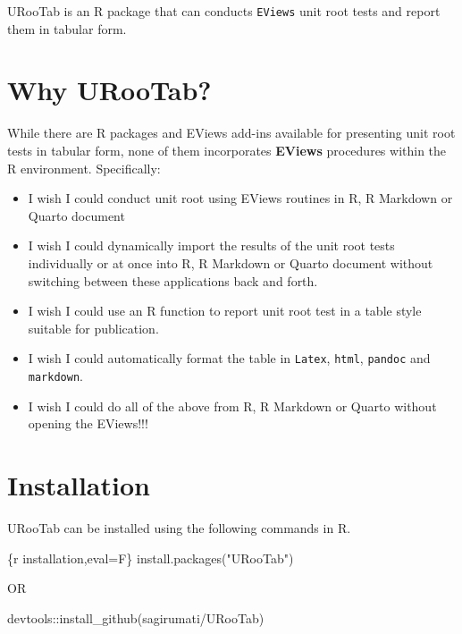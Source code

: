 \documentclass[
  letterpaper,
  DIV=11,
  numbers=noendperiod]{scrartcl}
\newenvironment{Shaded}{\begin{snugshade}}{\end{snugshade}}
\newcommand{\FunctionTok}[1]{\textcolor[rgb]{0.28,0.35,0.67}{#1}}
\newcommand{\InformationTok}[1]{\textcolor[rgb]{0.37,0.37,0.37}{#1}}
\newcommand{\NormalTok}[1]{\textcolor[rgb]{0.00,0.23,0.31}{#1}}
\newcommand{\SpecialCharTok}[1]{\textcolor[rgb]{0.37,0.37,0.37}{#1}}
\newcommand{\StringTok}[1]{\textcolor[rgb]{0.13,0.47,0.30}{#1}}
\begin{document}
URooTab is an R package that can conducts \texttt{EViews} unit root
tests and report them in tabular form.

\hypertarget{why-urootab}{%
\section{Why URooTab?}\label{why-urootab}}

While there are R packages and EViews add-ins available for presenting
unit root tests in tabular form, none of them incorporates
\textbf{EViews} procedures within the R environment. Specifically:

\begin{itemize}
\item
  I wish I could conduct unit root using EViews routines in R, R
  Markdown or Quarto document
\item
  I wish I could dynamically import the results of the unit root tests
  individually or at once into R, R Markdown or Quarto document without
  switching between these applications back and forth.
\item
  I wish I could use an R function to report unit root test in a table
  style suitable for publication.
\item
  I wish I could automatically format the table in \texttt{Latex},
  \texttt{html}, \texttt{pandoc} and \texttt{markdown}.
\item
  I wish I could do all of the above from R, R Markdown or Quarto
  without opening the EViews!!!
\end{itemize}

\hypertarget{installation}{%
\section{Installation}\label{installation}}

URooTab can be installed using the following commands in R.

\begin{Shaded}
\begin{Highlighting}[]
\InformationTok{\textasciigrave{}\textasciigrave{}\textasciigrave{}\{r installation,eval=F\}}
\FunctionTok{install.packages}\NormalTok{(}\StringTok{"URooTab"}\NormalTok{) }

\NormalTok{            OR}
            
\NormalTok{devtools}\SpecialCharTok{::}\FunctionTok{install\_github}\NormalTok{(}\StringTok{\textquotesingle{}sagirumati/URooTab\textquotesingle{}}\NormalTok{)}
\InformationTok{\textasciigrave{}\textasciigrave{}\textasciigrave{}}
\end{Highlighting}
\end{Shaded}
\end{document}
